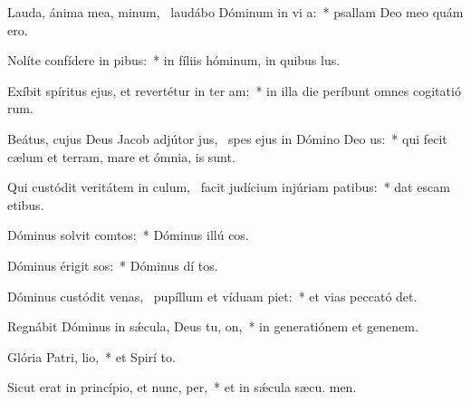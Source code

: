 \item Lauda, ánima mea, minum,~\pscross{} laudábo Dóminum in vi a:~* psallam Deo meo quám ero.
\item Nolíte confídere in pibus:~* in fíliis hóminum, in quibus   lus.
\item Exíbit spíritus ejus, et revertétur in ter am:~* in illa die períbunt omnes cogitatió rum.
\item Beátus, cujus Deus Jacob adjútor jus,~\pscross{} spes ejus in Dómino Deo us:~* qui fecit cælum et terram, mare et ómnia,   is sunt.
\item Qui custódit veritátem in culum,~\pscross{} facit judícium injúriam patibus:~* dat escam etibus.
\item Dóminus solvit comtos:~* Dóminus illú cos.
\item Dóminus érigit sos:~* Dóminus dí tos.
\item Dóminus custódit venas,~\pscross{} pupíllum et víduam piet:~* et vias peccató det.
\item Regnábit Dóminus in sǽcula, Deus tu, on,~* in generatiónem et genenem.
\item Glória Patri,  lio,~* et Spirí to.
\item Sicut erat in princípio, et nunc,  per,~* et in sǽcula sæcu. men.

